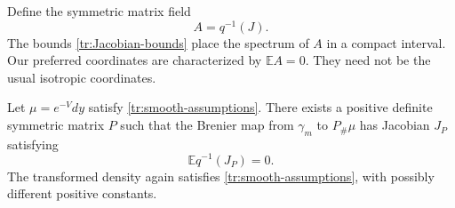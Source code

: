 Define the symmetric matrix field
\begin{equation}\label{tr:A-definition}
 A=q^{-1}(J).
\end{equation}
The bounds \eqref{tr:Jacobian-bounds} place the spectrum of $A$ in a
compact interval.  Our preferred coordinates are characterized by
$\mathbb EA=0$.  They need not be the usual isotropic coordinates.

\begin{proposition}\label{tr:normalization}
Let $\mu=e^{-V}dy$ satisfy \eqref{tr:smooth-assumptions}.  There exists a
positive definite symmetric matrix $P$ such that the Brenier map from
$\gamma_m$ to $P_\#\mu$ has Jacobian $J_P$ satisfying
\[
 \mathbb E q^{-1}(J_P)=0.
\]
The transformed density again satisfies
\eqref{tr:smooth-assumptions}, with possibly different positive constants.
\end{proposition}
